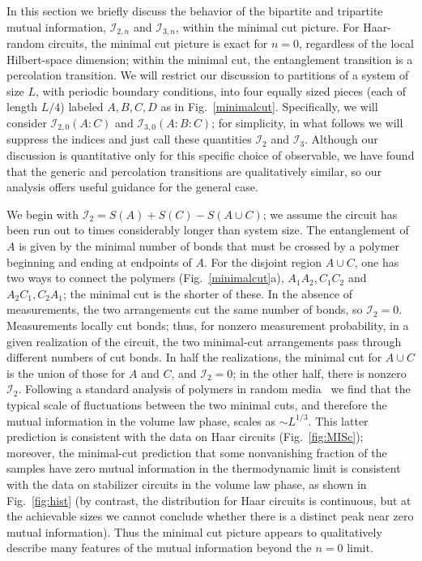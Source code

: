 \documentclass[prl,twocolumn,aps,showpacs,amsmath,amssymb,superscriptaddress,floatfix,longbibliography]{revtex4-1}
\begin{document}
In this section we briefly discuss the behavior of the bipartite and tripartite mutual information, $\mathcal{I}_{2,n}$ and $\mathcal{I}_{3,n}$, within the minimal cut picture. For Haar-random circuits, the minimal cut picture is exact for $n = 0$, regardless of the local Hilbert-space dimension; within the minimal cut, the entanglement transition is a percolation transition. We will restrict our discussion to partitions of a system of size $L$, with periodic boundary conditions, into four equally sized pieces (each of length $L/4$) labeled $A,B,C,D$ as in Fig.~\ref{minimalcut}. Specifically, we will consider $\mathcal{I}_{2,0}(A:C)$ and $\mathcal{I}_{3,0}(A:B:C)$; for simplicity, in what follows we will suppress the indices and just call these quantities $\mathcal{I}_2$ and $\mathcal{I}_3$. Although our discussion is quantitative only for this specific choice of observable, we have found that the generic and percolation transitions are qualitatively similar, so our analysis offers useful guidance for the general case. 

We begin with $\mathcal{I}_2 = S(A) + S(C) - S(A \cup C)$; we assume the circuit has been run out to times considerably longer than system size. The entanglement of $A$ is given by the minimal number of bonds that must be crossed by a polymer beginning and ending at endpoints of $A$. For the disjoint region $A \cup C$, one has two ways to connect the polymers (Fig.~\ref{minimalcut}a), $A_1 A_2, C_1 C_2$ and $A_2 C_1, C_2 A_1$; the minimal cut is the shorter of these. In the absence of measurements, the two arrangements cut the same number of bonds, so $\mathcal{I}_2 = 0$. Measurements locally cut bonds; thus, for nonzero measurement probability, in a given realization of the circuit, the two minimal-cut arrangements pass through different numbers of cut bonds. In half the realizations, the minimal cut for $A \cup C$ is the union of those for $A$ and $C$, and $\mathcal{I}_2 = 0$; in the other half, there is nonzero $\mathcal{I}_2$. Following a standard analysis of polymers in random media~\cite{kz} we find that the typical scale of fluctuations between the two minimal cuts, and therefore the mutual information in the volume law phase, scales as $\sim L^{1/3}$. This latter prediction is consistent with the data on Haar circuits (Fig.~\ref{fig:MISc}); moreover, the minimal-cut prediction that some nonvanishing fraction of the samples have zero mutual information in the thermodynamic limit is consistent with the data on stabilizer circuits in the volume law phase, as shown in Fig.~\ref{fig:hist} (by contrast, the distribution for Haar circuits is continuous, but at the achievable sizes we cannot conclude whether there is a distinct peak near zero mutual information). Thus the minimal cut picture appears to qualitatively describe many features of the mutual information beyond the $n = 0$ limit.
\end{document}
